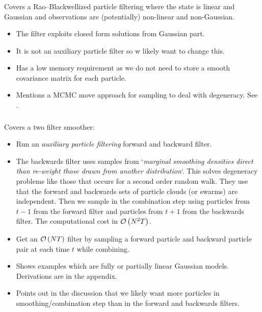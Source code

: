 \subsubsection*{\cite{andrieu02}}
Covers a Rao–Blackwellized particle filtering where the state is linear and Gaussian and observations are (potentially) non-linear and non-Gaussian. 

\begin{itemize}
	\item The filter exploits closed form solutions from Gaussian part.
	\item It is not an auxiliary particle filter so w likely want to change this.
	\item Has a low memory requirement as we do not need to store a smooth covariance matrix for each particle.
	\item Mentions a MCMC move approach for sampling to deal with degeneracy. See \cite{de97}.
\end{itemize}

\subsubsection*{\cite{fearnhead10}}
Covers a two filter smoother:
\begin{itemize}
	\item Run an \emph{auxiliary particle filtering} forward and backward filter.
	\item The backwards filter uses samples from `\textit{marginal smoothing densities direct than re-weight those drawn from another distribution}`. This solves degeneracy problems  like those that occurs for a second order random walk. They use that the forward and backwards sets of particle clouds (or swarms) are independent. Then we sample in the combination step using particles from $t-1$ from the forward filter and particles from $t + 1$ from the backwards filter. The computational cost in $\mathcal{O}\left( N^2T\right)$.
	\item Get an $\mathcal{O}\left( NT\right)$ filter by sampling a forward particle and backward particle pair at each time $t$ while combining.
	\item Shows examples which are fully or partially linear Gaussian models. Derivations are in the appendix.
	\item Points out in the discussion that we likely want more particles in smoothing/combination step than in the forward and backwards filters.
\end{itemize}
\fi



